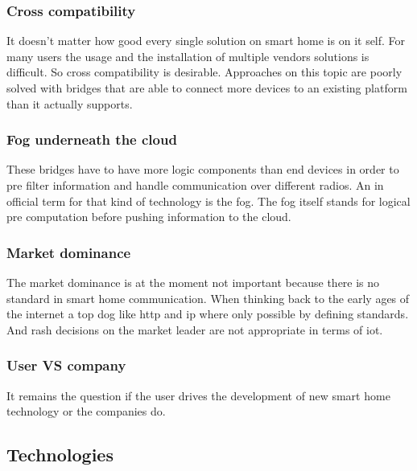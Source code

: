 		\subsubsection{Cross compatibility}	
			It doesn't matter how good every single solution on smart home is on it self. For many users the usage and the installation of multiple vendors solutions is difficult. So cross compatibility is desirable. Approaches on this topic are poorly solved with bridges that are able to connect more devices to an existing platform than it actually supports.\\

		\subsubsection{Fog underneath the cloud}
			These bridges have to have more logic components than end devices in order to pre filter information and handle communication over different radios. An in official term for that kind of technology is the fog. The fog itself stands for logical pre computation before pushing information to the cloud.\\

		\subsubsection{Market dominance}
			The market dominance is at the moment not important because there is no standard in smart home communication. When thinking back to the early ages of the internet a top dog like http and ip where only possible by defining standards. And rash decisions on the market leader are not appropriate in terms of iot.\\

		\subsubsection{User VS company}
			It remains the question if the user drives the development of new smart home technology or the companies do.\\

			\pagebreak




	\subsection{Technologies}

